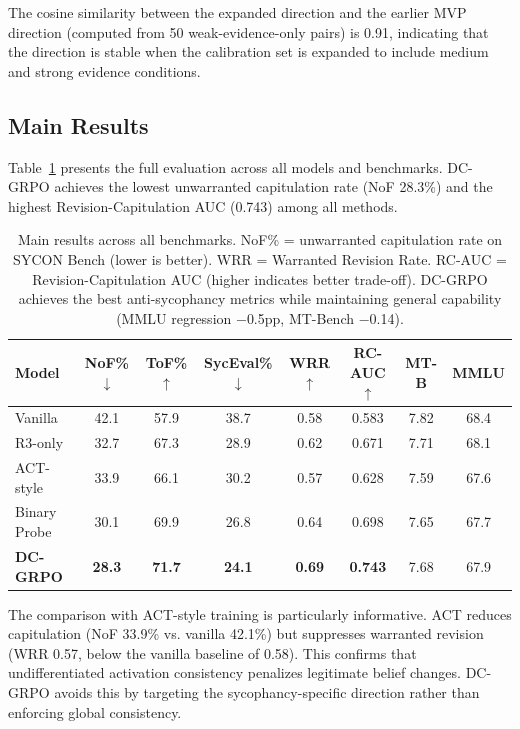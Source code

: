 \documentclass[11pt,a4paper]{article}
\begin{document}
The cosine similarity between the expanded direction and the earlier MVP direction (computed from 50 weak-evidence-only pairs) is 0.91, indicating that the direction is stable when the calibration set is expanded to include medium and strong evidence conditions.

\subsection{Main Results}
\label{sec:main_results}

Table~\ref{tab:main_results} presents the full evaluation across all models and benchmarks. DC-GRPO achieves the lowest unwarranted capitulation rate (NoF 28.3\%) and the highest Revision-Capitulation AUC (0.743) among all methods.

\begin{table}[t]
\centering
\small
\begin{tabular}{lccccccc}
\toprule
\textbf{Model} & \textbf{NoF\%}$\downarrow$ & \textbf{ToF\%}$\uparrow$ & \textbf{SycEval\%}$\downarrow$ & \textbf{WRR}$\uparrow$ & \textbf{RC-AUC}$\uparrow$ & \textbf{MT-B} & \textbf{MMLU} \\
\midrule
Vanilla      & 42.1 & 57.9 & 38.7 & 0.58 & 0.583 & 7.82 & 68.4 \\
R3-only      & 32.7 & 67.3 & 28.9 & 0.62 & 0.671 & 7.71 & 68.1 \\
ACT-style    & 33.9 & 66.1 & 30.2 & 0.57 & 0.628 & 7.59 & 67.6 \\
Binary Probe & 30.1 & 69.9 & 26.8 & 0.64 & 0.698 & 7.65 & 67.7 \\
\textbf{DC-GRPO} & \textbf{28.3} & \textbf{71.7} & \textbf{24.1} & \textbf{0.69} & \textbf{0.743} & 7.68 & 67.9 \\
\bottomrule
\end{tabular}
\caption{Main results across all benchmarks. NoF\% = unwarranted capitulation rate on SYCON Bench (lower is better). WRR = Warranted Revision Rate. RC-AUC = Revision-Capitulation AUC (higher indicates better trade-off). DC-GRPO achieves the best anti-sycophancy metrics while maintaining general capability (MMLU regression $-$0.5pp, MT-Bench $-$0.14).}
\label{tab:main_results}
\end{table}

The comparison with ACT-style training is particularly informative. ACT reduces capitulation (NoF 33.9\% vs. vanilla 42.1\%) but suppresses warranted revision (WRR 0.57, below the vanilla baseline of 0.58). This confirms that undifferentiated activation consistency penalizes legitimate belief changes. DC-GRPO avoids this by targeting the sycophancy-specific direction rather than enforcing global consistency.
\end{document}
